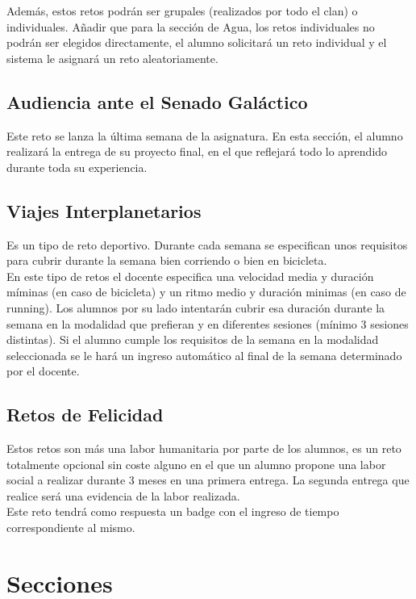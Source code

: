Además, estos retos podrán ser grupales (realizados por todo el clan) o individuales. Añadir que para la sección de Agua, los retos individuales no podrán ser elegidos directamente, el alumno solicitará un reto individual y el sistema le asignará un reto aleatoriamente.

\subsection{Audiencia ante el Senado Galáctico}
Este reto se lanza la última semana de la asignatura. En esta sección, el alumno realizará la entrega de su proyecto final, en el que reflejará todo lo aprendido durante toda su experiencia.

\subsection{Viajes Interplanetarios}
Es un tipo de reto deportivo. Durante cada semana se especifican unos requisitos para cubrir durante la semana bien corriendo o bien en bicicleta.\\

En este tipo de retos el docente especifica una velocidad media y duración míminas (en caso de bicicleta) y un ritmo medio y duración minimas (en caso de running). Los alumnos por su lado intentarán cubrir esa duración durante la semana en la modalidad que prefieran y en diferentes sesiones (mínimo 3 sesiones distintas). Si el alumno cumple los requisitos de la semana en la modalidad seleccionada se le hará un ingreso automático al final de la semana determinado por el docente.

\subsection{Retos de Felicidad}
Estos retos son más una labor humanitaria por parte de los alumnos, es un reto totalmente opcional sin coste alguno en el que un alumno propone una labor social a realizar durante 3 meses en una primera entrega. La segunda entrega que realice será una evidencia de la labor realizada.\\

Este reto tendrá como respuesta un badge con el ingreso de tiempo correspondiente al mismo.

\newpage

\section{Secciones}

